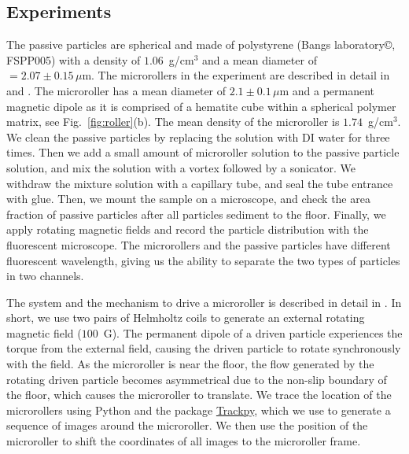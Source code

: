 \documentclass[12pt]{article}
\begin{document}
\subsection*{Experiments}
The passive particles are spherical and made of polystyrene (Bangs laboratory\copyright, FSPP005) with a density of $ 1.06$~g/cm$^3$ and a mean diameter of $= 2.07 \pm 0.15 \, \mu \mathrm{m}$. 
The microrollers in the experiment are described in detail in \cite{van_der_wee_simple_2023} and \cite{sprinkle_driven_2020}. 
The microroller has a mean diameter of $2.1 \pm 0.1 \, \mu \mathrm{m}$ and a permanent magnetic dipole as it is comprised of a hematite cube within a spherical polymer matrix, see Fig.~\ref{fig:roller}(b). The mean density of the microroller is $1.74$~g/cm$^3$.
We clean the passive particles by replacing the solution with DI water for three times. Then we add a small amount of microroller solution to the passive particle solution, and mix the solution with a vortex followed by a sonicator. We withdraw the mixture solution with a capillary tube, and seal the tube entrance with glue. Then, we mount the sample on a microscope, and check the area fraction of passive particles after all particles sediment to the floor. Finally, we apply rotating magnetic fields and record the particle distribution with the fluorescent microscope. The microrollers and the passive particles have different fluorescent wavelength, giving us the ability to separate the two types of particles in two channels.

The system and the mechanism to drive a microroller is described in detail in \cite{sprinkle_driven_2020}. In short, we use two pairs of Helmholtz coils to generate an external rotating magnetic field ($100$~G). The permanent dipole of a driven particle experiences the torque from the external field, causing the driven particle to rotate synchronously with the field. As the microroller is near the floor, the flow generated by the rotating driven particle becomes asymmetrical due to the non-slip boundary of the floor, which causes the microroller to translate.
We trace the location of the microrollers using Python and the package \href{https://soft-matter.github.io/trackpy/v0.6.1/}{Trackpy}, which we use to generate a sequence of images around the microroller. We then use the position of the microroller to shift the coordinates of all images to the microroller frame.
\end{document}
